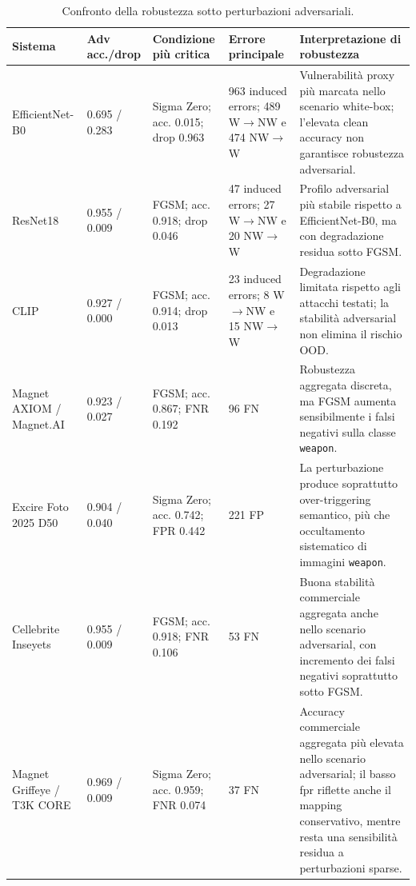 \begin{table}[H]
\centering
\caption{Confronto della robustezza sotto perturbazioni adversariali.}
\label{tab:results-comparative-adversarial}
\small
\renewcommand{\arraystretch}{1.18}
\setlength{\tabcolsep}{3pt}
\begin{tabularx}{\textwidth}{@{}p{2.7cm} p{1.8cm} p{3.1cm} p{2.8cm} X@{}}
\toprule
\textbf{Sistema} &
\textbf{Adv acc./drop} &
\textbf{Condizione più critica} &
\textbf{Errore principale} &
\textbf{Interpretazione di robustezza} \\
\midrule

EfficientNet-B0 &
0.695 / 0.283 &
Sigma Zero; acc. 0.015; drop 0.963 &
963 induced errors; 489 W$\rightarrow$NW e 474 NW$\rightarrow$W &
Vulnerabilità proxy più marcata nello scenario white-box; l'elevata clean accuracy
non garantisce robustezza adversarial. \\

ResNet18 &
0.955 / 0.009 &
FGSM; acc. 0.918; drop 0.046 &
47 induced errors; 27 W$\rightarrow$NW e 20 NW$\rightarrow$W &
Profilo adversarial più stabile rispetto a EfficientNet-B0, ma con degradazione
residua sotto FGSM. \\

CLIP &
0.927 / 0.000 &
FGSM; acc. 0.914; drop 0.013 &
23 induced errors; 8 W$\rightarrow$NW e 15 NW$\rightarrow$W &
Degradazione limitata rispetto agli attacchi testati; la stabilità adversarial
non elimina il rischio OOD. \\

Magnet AXIOM / Magnet.AI &
0.923 / 0.027 &
FGSM; acc. 0.867; FNR 0.192 &
96 FN &
Robustezza aggregata discreta, ma FGSM aumenta sensibilmente i falsi negativi
sulla classe \texttt{weapon}. \\

Excire Foto 2025 D50 &
0.904 / 0.040 &
Sigma Zero; acc. 0.742; FPR 0.442 &
221 FP &
La perturbazione produce soprattutto over-triggering semantico, più che
occultamento sistematico di immagini \texttt{weapon}. \\

Cellebrite Inseyets &
0.955 / 0.009 &
FGSM; acc. 0.918; FNR 0.106 &
53 FN &
Buona stabilità commerciale aggregata anche nello scenario adversarial, con
incremento dei falsi negativi soprattutto sotto FGSM. \\

Magnet Griffeye / T3K CORE &
0.969 / 0.009 &
Sigma Zero; acc. 0.959; FNR 0.074 &
37 FN &
Accuracy commerciale aggregata più elevata nello scenario adversarial; il basso
\gls{fpr} riflette anche il mapping conservativo, mentre resta una sensibilità
residua a perturbazioni sparse. \\


\end{tabularx}
\end{table}
